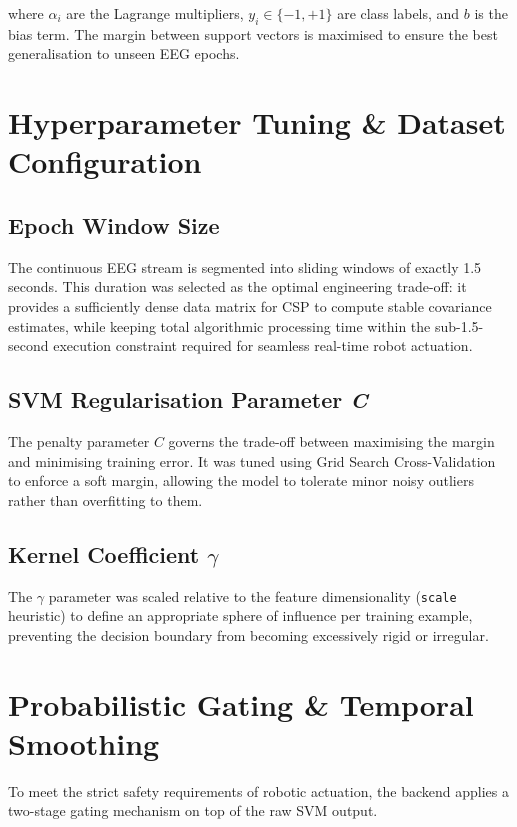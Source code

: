 \documentclass[12pt, a4paper, oneside]{report}
\begin{document}
where $\alpha_i$ are the Lagrange multipliers, $y_i \in \{-1, +1\}$ are class labels,
and $b$ is the bias term. The margin between support vectors is maximised to ensure
the best generalisation to unseen EEG epochs.

\section{Hyperparameter Tuning \& Dataset Configuration}

\subsection{Epoch Window Size}

The continuous EEG stream is segmented into sliding windows of exactly 1.5 seconds.
This duration was selected as the optimal engineering trade-off: it provides a
sufficiently dense data matrix for CSP to compute stable covariance estimates, while
keeping total algorithmic processing time within the sub-1.5-second execution
constraint required for seamless real-time robot actuation.

\subsection{SVM Regularisation Parameter \textit{C}}

The penalty parameter $C$ governs the trade-off between maximising the margin and
minimising training error. It was tuned using Grid Search Cross-Validation to enforce
a soft margin, allowing the model to tolerate minor noisy outliers rather than
overfitting to them.

\subsection{Kernel Coefficient \texorpdfstring{$\gamma$}{gamma}}

The $\gamma$ parameter was scaled relative to the feature dimensionality
(\texttt{scale} heuristic) to define an appropriate sphere of influence per training
example, preventing the decision boundary from becoming excessively rigid or irregular.

\section{Probabilistic Gating \& Temporal Smoothing}

To meet the strict safety requirements of robotic actuation, the backend applies a
two-stage gating mechanism on top of the raw SVM output.
\end{document}

